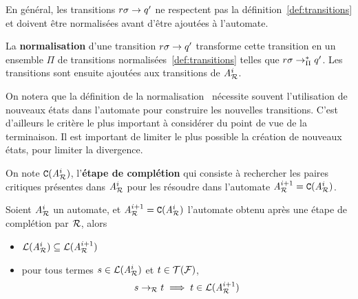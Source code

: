 En général, les transitions $r\sigma \rightarrow q'$ ne respectent pas la définition~\ref{def:transitions}
et doivent être normalisées avant d'être ajoutées à l'automate.


\begin{definition}
  La \textbf{normalisation} d'une transition $r\sigma \rightarrow q'$ transforme cette
  transition en un ensemble $\Pi$ de transitions normalisées~\ref{def:transitions}
  telles que $r\sigma \rightarrow_\Pi^* q'$. Les transitions sont ensuite ajoutées aux transitions de ${\mathit A}_{\mathcal R}^i$.
\end{definition}
On notera que la définition de la normalisation~\cite{Genet-RTA98} nécessite 
souvent l'utilisation de nouveaux états dans l'automate pour construire 
les nouvelles transitions. C'est d'ailleurs le critère le plus important
à considérer du point de vue de la terminaison. Il est important de limiter le
plus possible la création de nouveaux états, pour limiter la divergence.

\begin{definition}
  On note $\mathtt{C}({\mathit A}_{\mathcal R}^i)$, l'\textbf{étape de complétion} qui consiste à rechercher les paires critiques présentes
  dans ${\mathit A}_{\mathcal R}^i$ pour les résoudre dans l'automate ${\mathit A}_{\mathcal R}^{i+1} = \mathtt{C}({\mathit A}_{\mathcal R}^i)$.
\end{definition}

\begin{property}
  Soient ${\mathit A}_{\mathcal R}^i$ un automate, et ${\mathit A}_{\mathcal R}^{i+1} = \mathtt{C}({\mathit A}_{\mathcal R}^i)$ l'automate obtenu après une
  étape de complétion par $\mathcal R$, alors
  \begin{itemize}
  \item $\mathcal{L}({\mathit A}_{\mathcal R}^i) \subseteq \mathcal{L}({\mathit A}_{\mathcal R}^{i+1})$

  \item  pour tous termes $s \in \mathcal{L}({\mathit A}_{\mathcal R}^i)$ et $t \in \mathcal{T(F)}$,
    \[s \rightarrow_\mathcal R t \; \Longrightarrow \; t\in \mathcal{L}({\mathit A}_{\mathcal R}^{i+1})\]
  \end{itemize}
\end{property}


